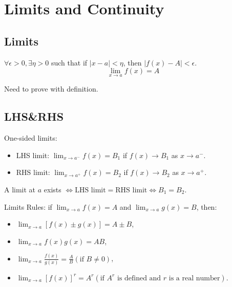 
\section{Limits and Continuity}

\subsection{Limits}

\begin{definition}
    $\forall \epsilon > 0, \exists \eta >0$ such that if $|x - a| < \eta$, then $|f(x) - A| < \epsilon$.
    \begin{equation*}
        \lim_{x \to a} f(x) = A
    \end{equation*}
\end{definition}

\begin{remark*}
    Need to prove with definition.
\end{remark*}


\subsection{LHS\&RHS}

\begin{proposition}[$LHS=RHS$]
    One-sided limits:
    \begin{itemize}
        \item LHS limit: $\lim_{x \to a^-} f(x)=B_1$ if $f(x) \to B_1$ as $x \to a^-$.
        \item RHS limit: $\lim_{x \to a^+} f(x)=B_2$ if $f(x) \to B_2$ as $x \to a^+$.
    \end{itemize}

    A limit at $a$ exists $\iff \text{LHS limit} = \text{RHS limit} \iff B_1=B_2$.
\end{proposition}

Limits Rules: if $\lim_{x \to a}f(x)=A $ and $\lim_{x \to a}g(x)=B $, then:
\begin{itemize}
    \item $\lim_{x \to a}[f(x) \pm g(x)] = A \pm B $,
    \item $\lim_{x \to a} f(x)g(x) = AB $,
    \item $\lim_{x \to a}\frac{f(x)}{g(x)} = \frac{A}{B} (\text{if } B \neq 0) $,
    \item $\lim_{x \to a} [f(x)]^r = A^r(\text{if $A^r$ is defined and $r$ is a real number})$.
\end{itemize}

